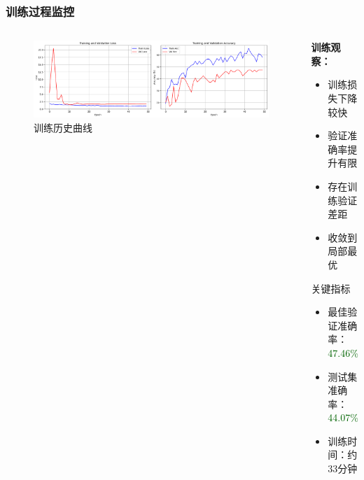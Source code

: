 \documentclass[12pt]{beamer}
\begin{document}
\begin{frame}
\frametitle{训练过程监控}
\begin{columns}
\begin{column}{0.5\textwidth}
\begin{figure}
\centering
\includegraphics[width=\textwidth]{training_history.png}
\caption{训练历史曲线}
\end{figure}
\end{column}

\begin{column}{0.5\textwidth}
\textbf{训练观察：}
\begin{itemize}
    \item 训练损失下降较快
    \item 验证准确率提升有限
    \item 存在训练验证差距
    \item 收敛到局部最优
\end{itemize}

\vspace{0.3cm}
\begin{block}{关键指标}
\begin{itemize}
    \item 最佳验证准确率：\textcolor{darkgreen}{47.46\%}
    \item 测试集准确率：\textcolor{darkgreen}{44.07\%}
    \item 训练时间：约33分钟
\end{itemize}
\end{block}
\end{column}
\end{columns}
\end{frame}
\end{document}
